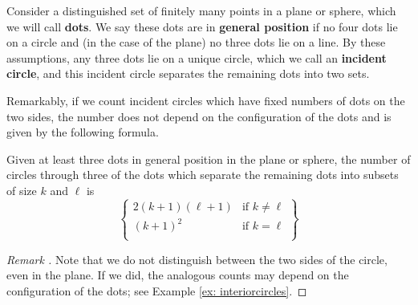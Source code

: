 \documentclass[11pt,oneside]{amsart}
\newenvironment{rethm}[1]
  {\renewcommand\theinnercustomthm{#1}\innercustomthm}
  {\endinnercustomthm}
\theoremstyle{definition}
\theoremstyle{remark}
\newenvironment{rem}{\refstepcounter{thm}\begin{proof}[Remark \emph{\thethm}]\renewcommand*{\qedsymbol}{\(\blacksquare\)}}{\end{proof}}
\numberwithin{equation}{section}
\begin{document}
Consider a distinguished set of finitely many points in a plane or sphere, which we will call \textbf{dots}.
We say these dots are in \textbf{general position} if no four dots lie on a circle and (in the case of the plane) no three dots lie on a line.
By these assumptions, any three dots lie on a unique circle, which we call an \textbf{incident circle}, and this incident circle separates the remaining dots into two sets.%


Remarkably, if we count incident circles which have fixed numbers of dots on the two sides, the number does not depend on the configuration of the dots and is given by the following formula.

\begin{rethm}{A}\label{thm: incident}
Given at least three dots in general position in the plane or sphere, the number of circles through three of the dots which separate the remaining dots into subsets of size $k$ and $\ell$ is
    \[
    \left\{
    \begin{array}{cc}
    2(k+1)(\ell+1) &\text{if $k\neq \ell$} \\
    (k+1)^2 &\text{if $k= \ell$} \\
    \end{array}
    \right\}
    \]
\end{rethm}

\begin{rem}
Note that we do not distinguish between the two sides of the circle, even in the plane. If we did, the analogous counts may depend on the configuration of the dots; see Example \ref{ex: interiorcircles}.
\end{rem}
\end{document}
